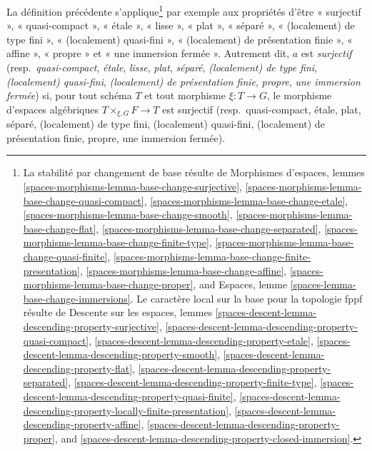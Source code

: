 \medskip\noindent
La définition précédente s'applique\footnote{La stabilité par changement
de base résulte de
Morphismes d'espaces, lemmes
\ref{spaces-morphisms-lemma-base-change-surjective},
\ref{spaces-morphisms-lemma-base-change-quasi-compact},
\ref{spaces-morphisms-lemma-base-change-etale},
\ref{spaces-morphisms-lemma-base-change-smooth},
\ref{spaces-morphisms-lemma-base-change-flat},
\ref{spaces-morphisms-lemma-base-change-separated},
\ref{spaces-morphisms-lemma-base-change-finite-type},
\ref{spaces-morphisms-lemma-base-change-quasi-finite},
\ref{spaces-morphisms-lemma-base-change-finite-presentation},
\ref{spaces-morphisms-lemma-base-change-affine},
\ref{spaces-morphisms-lemma-base-change-proper}, and
Espaces, lemme
\ref{spaces-lemma-base-change-immersions}.
Le caractère local sur la base pour la topologie fppf résulte de
Descente sur les espaces, lemmes
\ref{spaces-descent-lemma-descending-property-surjective},
\ref{spaces-descent-lemma-descending-property-quasi-compact},
\ref{spaces-descent-lemma-descending-property-etale},
\ref{spaces-descent-lemma-descending-property-smooth},
\ref{spaces-descent-lemma-descending-property-flat},
\ref{spaces-descent-lemma-descending-property-separated},
\ref{spaces-descent-lemma-descending-property-finite-type},
\ref{spaces-descent-lemma-descending-property-quasi-finite},
\ref{spaces-descent-lemma-descending-property-locally-finite-presentation},
\ref{spaces-descent-lemma-descending-property-affine},
\ref{spaces-descent-lemma-descending-property-proper}, and
\ref{spaces-descent-lemma-descending-property-closed-immersion}.
}
par exemple aux propriétés d'être
« surjectif »,
« quasi-compact »,
« étale »,
« lisse »,
« plat »,
« séparé »,
« (localement) de type fini »,
« (localement) quasi-fini »,
« (localement) de présentation finie »,
« affine »,
« propre » et
« une immersion fermée ».
Autrement dit, $a$ est
{\it surjectif}
(resp.\ {\it quasi-compact},
{\it étale},
{\it lisse},
{\it plat},
{\it séparé},
{\it (localement) de type fini},
{\it (localement) quasi-fini},
{\it (localement) de présentation finie},
{\it propre},
{\it une immersion fermée})
si, pour tout schéma $T$ et tout morphisme $\xi : T \to G$,
le morphisme d'espaces algébriques $T \times_{\xi, G} F \to T$ est
surjectif
(resp.\ quasi-compact,
étale,
plat,
séparé,
(localement) de type fini,
(localement) quasi-fini,
(localement) de présentation finie,
propre,
une immersion fermée).

